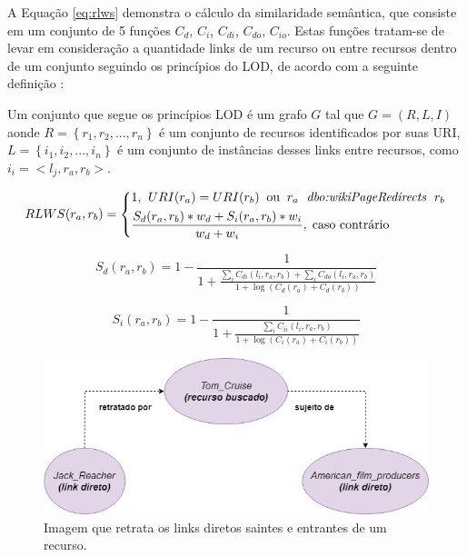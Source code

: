 A Equação \ref{eq:rlws} demonstra o cálculo da similaridade semântica, que consiste em um conjunto de 5 funções  $C_d$, $C_i$, $C_{di}$, $C_{do}$, $C_{io}$. Estas funções tratam-se de levar em consideração a quantidade links de um recurso ou entre recursos dentro de um conjunto seguindo os princípios do \ac{LOD}, de acordo com a seguinte definição \citep{PiaoResim}:

\begin{definition}
Um conjunto que segue os princípios LOD é um grafo $G$ tal que $G = (R, L, I)$ aonde $R = \left\{r_1, r_2, ..., r_n\right\}$ é um conjunto de recursos identificados por suas URI, $L = \left\{i_1, i_2, ..., i_n\right\}$ é um conjunto de instâncias desses links entre recursos, como $i_i = <l_j, r_a, r_b>$.
\end{definition}

\begin{equation}
	RLWS(r_a, r_b) = 
	\begin{dcases*}
		1 \text{,} \;\; URI(r_a) = URI(r_b) \;\; \text{ou} \;\; r_a \; \textit{ dbo:wikiPageRedirects } \; r_b\\
		\frac{S_d(r_a, r_b) * w_d + S_i(r_a, r_b) * w_i}{w_d + w_i}, \; \text{caso contrário}
	\end{dcases*}
\label{eq:rlws}
\end{equation}

\begin{equation}
	S_d(r_a, r_b) = 1 - \frac{1}{1 + \frac{\sum_i C_{di}(l_i, r_a, r_b) + \sum_i C_{do}(l_i, r_a, r_b)}{1 + \log (C_d(r_a) + C_d(r_b))}}
\label{eq:rlws_ex1}
\end{equation}

\begin{equation}
	S_i(r_a, r_b) = 1 - \frac{1}{1 + \frac{\sum_i C_{ii}(l_i, r_a, r_b)}{1 + \log (C_i(r_a) + C_i(r_b))}}
\label{eq:rlws_ex2}
\end{equation}

\begin{figure}
	\centering
	\includegraphics[scale=0.4]{imagens/cd_links.png}
	\caption{Imagem que retrata os links diretos saintes e entrantes de um recurso.}
	\label{fig:cd_links}
\end{figure}

